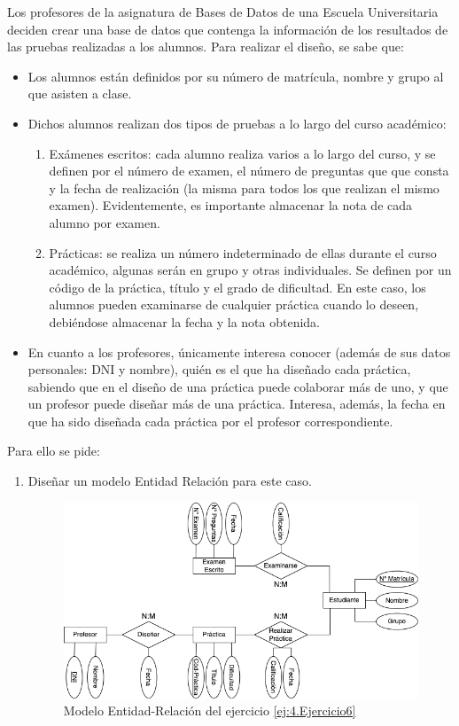 \newpage
\begin{ejercicio}\label{ej:4.Ejercicio6}
    Los profesores de la asignatura de Bases de Datos de una Escuela Universitaria deciden crear una base de datos que contenga la información de los resultados de las pruebas realizadas a los alumnos. Para realizar el diseño, se sabe que:
    \begin{itemize}
        \item Los alumnos están definidos por su número de matrícula, nombre y grupo al que asisten a clase.
        \item Dichos alumnos realizan dos tipos de pruebas a lo largo del curso académico:
        \begin{enumerate}
            \item Exámenes escritos: cada alumno realiza varios a lo largo del curso, y se definen por el número de examen, el número de preguntas que que consta y la fecha de realización (la misma para todos los que realizan el mismo examen). Evidentemente, es importante almacenar la nota de cada alumno por examen.

            \item Prácticas: se realiza un número indeterminado de ellas durante el curso académico, algunas serán en grupo y otras individuales. Se definen por un código de la práctica, título y el grado de dificultad. En este caso, los alumnos pueden examinarse de cualquier práctica cuando lo deseen, debiéndose almacenar la fecha y la nota obtenida.
        \end{enumerate}

        \item En cuanto a los profesores, únicamente interesa conocer (además de sus datos personales: DNI y nombre), quién es el que ha diseñado cada práctica, sabiendo que en el diseño de una práctica puede colaborar más de uno, y que un profesor puede diseñar más de una práctica. Interesa, además, la fecha en que ha sido diseñada cada práctica por el profesor correspondiente.
    \end{itemize}

    Para ello se pide:
    \begin{enumerate}
        \item Diseñar un modelo Entidad Relación para este caso.

        \begin{figure}[H]
            \centering
            \includegraphics[width=0.8\linewidth]{Imagenes/Ejercicio 6.png}
            \caption{Modelo Entidad-Relación del ejercicio \ref{ej:4.Ejercicio6}}
            \label{fig:Ej6}
        \end{figure}


\end{enumerate}
\end{ejercicio}
